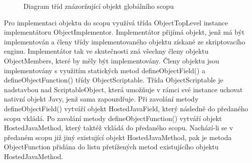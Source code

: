 \begin{figure}[H]
  \begin{center}
    \caption{Diagram tříd znázorňující objekt globálního scopu}
    \label{Figure.ObjectTopLevel}
  \end{center}
\end{figure}

Pro implementaci objektu do scopu využívá třída ObjectTopLevel instance implementátoru ObjectImplementor. Implementátor přijímá objekt, jenž má být implementován a členy třídy implementovaného objektu získané ze skriptovacího enginu. Implementátor tak ve skutečnosti zná všechny členy objektu ObjectMembers, které by měly být implementovány. Členy objektu jsou implementovány s využitím statických metod defineObjectField() a defineObjectFunction() třídy ObjectScriptable. Třída ObjectScriptable je nadstavbou nad ScriptableObject, která umožňuje v rámci své instance uchovat nativní objekt Javy, jenž sama zapouzdřuje. Při zavolání metody defineObjectField() vytváří objekt HostedJavaField, který následně do předaného scopu vkládá. Po zavolání metody defineObjectFunction() vytváří objekt HostedJavaMethod, který taktéž vkládá do předaného scopu. Nachází-li se v předaném scopu již jiný existující objekt HostedJavaMethod, pak je metoda ObjectFunction přidána do listu přetížených metod existujícího objektu HostedJavaMethod.

